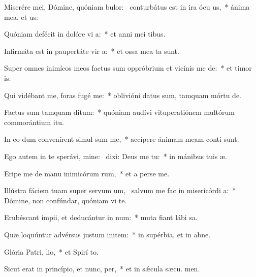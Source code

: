\item Miserére mei, Dómine, quóniam bulor:~\pscross{} conturbátus est in ira ócu us,~* ánima mea, et  us:
\item Quóniam defécit in dolóre vi a:~* et anni mei  tibus.
\item Infirmáta est in paupertáte vir a:~* et ossa mea ta sunt.
\item Super omnes inimícos meos factus sum oppróbrium et vicínis me de:~* et timor  is.
\item Qui vidébant me, foras fugé  me:~* oblivióni datus sum, tamquam mórtu  de.
\item Factus sum tamquam  ditum:~* quóniam audívi vituperatiónem multórum commorántium  itu.
\item In eo dum convenírent simul sum me,~* accípere ánimam meam conti sunt.
\item Ego autem in te sperávi, mine:~\pscross{} dixi: Deus me  tu:~* in mánibus tuis  æ.
\item Eripe me de manu inimicórum rum,~* et a perse me.
\item Illústra fáciem tuam super servum um,~\pscross{} salvum me fac in misericórdi a:~* Dómine, non confúndar, quóniam vi te.
\item Erubéscant ímpii, et deducántur in num:~* muta fiant lábi sa.
\item Quæ loquúntur advérsus justum initem:~* in supérbia, et in abne.
\item Glória Patri,  lio,~* et Spirí to.
\item Sicut erat in princípio, et nunc,  per,~* et in sǽcula sæcu. men.
